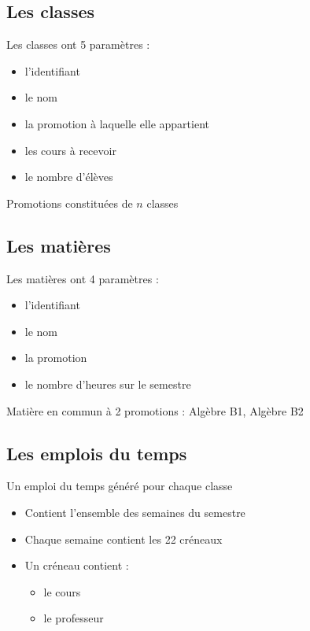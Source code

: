 \documentclass{beamer}
\begin{document}
\subsection{Les classes}
\begin{frame}
Les classes ont 5 paramètres : 
\begin{itemize}
\item l'identifiant
\item le nom
\item la promotion à laquelle elle appartient
\item les cours à recevoir
\item le nombre d'élèves\\
\end{itemize}
\vspace{\baselineskip}
Promotions constituées de $n$ classes
\end{frame}

\subsection{Les matières}
\begin{frame}
Les matières ont 4 paramètres : 
\begin{itemize}
\item l'identifiant
\item le nom
\item la promotion
\item le nombre d'heures sur le semestre\\
\end{itemize}
\vspace{\baselineskip}
Matière en commun à 2 promotions : Algèbre B1, Algèbre B2\\ 
\end{frame}

\subsection{Les emplois du temps}
\begin {frame}
Un emploi du temps généré pour chaque classe\\

\begin{itemize}
\item Contient l'ensemble des semaines du semestre
\item Chaque semaine contient les 22 créneaux
\item Un créneau contient : 
\begin {itemize}
\item le cours
\item le professeur
\end{itemize}
\end{itemize}
\end{frame}
\end{document}
